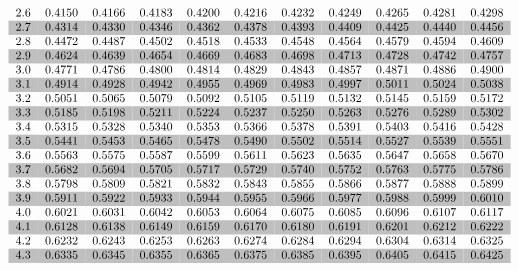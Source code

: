 \documentclass[12pt]{article}
\begin{document}
\begin{equation*}
\begin{tabular}{*{11}{c}}
2.6 & 0.4150 & 0.4166 & 0.4183 & 0.4200 & 0.4216 & 0.4232 & 0.4249 & 0.4265 & 0.4281 & 0.4298 \\
\rowcolor[gray]{0.75}
2.7 & 0.4314 & 0.4330 & 0.4346 & 0.4362 & 0.4378 & 0.4393 & 0.4409 & 0.4425 & 0.4440 & 0.4456 \\
2.8 & 0.4472 & 0.4487 & 0.4502 & 0.4518 & 0.4533 & 0.4548 & 0.4564 & 0.4579 & 0.4594 & 0.4609 \\
\rowcolor[gray]{0.75}
2.9 & 0.4624 & 0.4639 & 0.4654 & 0.4669 & 0.4683 & 0.4698 & 0.4713 & 0.4728 & 0.4742 & 0.4757 \\
3.0 & 0.4771 & 0.4786 & 0.4800 & 0.4814 & 0.4829 & 0.4843 & 0.4857 & 0.4871 & 0.4886 & 0.4900 \\
\rowcolor[gray]{0.75}
3.1 & 0.4914 & 0.4928 & 0.4942 & 0.4955 & 0.4969 & 0.4983 & 0.4997 & 0.5011 & 0.5024 & 0.5038 \\
3.2 & 0.5051 & 0.5065 & 0.5079 & 0.5092 & 0.5105 & 0.5119 & 0.5132 & 0.5145 & 0.5159 & 0.5172 \\
\rowcolor[gray]{0.75}
3.3 & 0.5185 & 0.5198 & 0.5211 & 0.5224 & 0.5237 & 0.5250 & 0.5263 & 0.5276 & 0.5289 & 0.5302 \\
3.4 & 0.5315 & 0.5328 & 0.5340 & 0.5353 & 0.5366 & 0.5378 & 0.5391 & 0.5403 & 0.5416 & 0.5428 \\
\rowcolor[gray]{0.75}
3.5 & 0.5441 & 0.5453 & 0.5465 & 0.5478 & 0.5490 & 0.5502 & 0.5514 & 0.5527 & 0.5539 & 0.5551 \\
3.6 & 0.5563 & 0.5575 & 0.5587 & 0.5599 & 0.5611 & 0.5623 & 0.5635 & 0.5647 & 0.5658 & 0.5670 \\
\rowcolor[gray]{0.75}
3.7 & 0.5682 & 0.5694 & 0.5705 & 0.5717 & 0.5729 & 0.5740 & 0.5752 & 0.5763 & 0.5775 & 0.5786 \\
3.8 & 0.5798 & 0.5809 & 0.5821 & 0.5832 & 0.5843 & 0.5855 & 0.5866 & 0.5877 & 0.5888 & 0.5899 \\
\rowcolor[gray]{0.75}
3.9 & 0.5911 & 0.5922 & 0.5933 & 0.5944 & 0.5955 & 0.5966 & 0.5977 & 0.5988 & 0.5999 & 0.6010 \\
4.0 & 0.6021 & 0.6031 & 0.6042 & 0.6053 & 0.6064 & 0.6075 & 0.6085 & 0.6096 & 0.6107 & 0.6117 \\
\rowcolor[gray]{0.75}
4.1 & 0.6128 & 0.6138 & 0.6149 & 0.6159 & 0.6170 & 0.6180 & 0.6191 & 0.6201 & 0.6212 & 0.6222 \\
4.2 & 0.6232 & 0.6243 & 0.6253 & 0.6263 & 0.6274 & 0.6284 & 0.6294 & 0.6304 & 0.6314 & 0.6325 \\
\rowcolor[gray]{0.75}
4.3 & 0.6335 & 0.6345 & 0.6355 & 0.6365 & 0.6375 & 0.6385 & 0.6395 & 0.6405 & 0.6415 & 0.6425 \\

\end{tabular}
\end{equation*}
\end{document}
